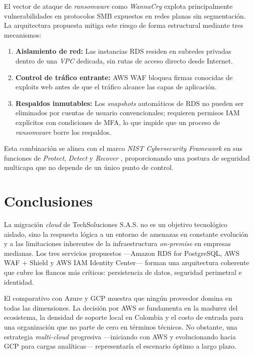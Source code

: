 \documentclass[12pt, a4paper]{article}
\begin{document}
El vector de ataque de \textit{ransomware} como \textit{WannaCry} explota principalmente vulnerabilidades en protocolos SMB expuestos en redes planas sin segmentación. La arquitectura propuesta mitiga este riesgo de forma estructural mediante tres mecanismos:

\begin{enumerate}
  \item \textbf{Aislamiento de red:} Las instancias RDS residen en subredes privadas dentro de una \textit{VPC} dedicada, sin rutas de acceso directo desde Internet.
  \item \textbf{Control de tráfico entrante:} AWS WAF bloquea firmas conocidas de exploits web antes de que el tráfico alcance las capas de aplicación.
  \item \textbf{Respaldos inmutables:} Los \textit{snapshots} automáticos de RDS no pueden ser eliminados por cuentas de usuario convencionales; requieren permisos IAM explícitos con condiciones de MFA, lo que impide que un proceso de \textit{ransomware} borre los respaldos.
\end{enumerate}

Esta combinación se alinea con el marco \textit{NIST Cybersecurity Framework} en sus funciones de \textit{Protect}, \textit{Detect} y \textit{Recover} \autocite{NIST2011}, proporcionando una postura de seguridad multicapa que no depende de un único punto de control.

\section{Conclusiones}

La migración \textit{cloud} de TechSoluciones S.A.S. no es un objetivo tecnológico aislado, sino la respuesta lógica a un entorno de amenazas en constante evolución y a las limitaciones inherentes de la infraestructura \textit{on-premise} en empresas medianas. Los tres servicios propuestos —Amazon RDS for PostgreSQL, AWS WAF + Shield y AWS IAM Identity Center— forman una arquitectura coherente que cubre los flancos más críticos: persistencia de datos, seguridad perimetral e identidad.

El comparativo con Azure y GCP muestra que ningún proveedor domina en todas las dimensiones. La decisión por AWS se fundamenta en la madurez del ecosistema, la densidad de soporte local en Colombia y el costo de entrada para una organización que no parte de cero en términos técnicos. No obstante, una estrategia \textit{multi-cloud} progresiva —iniciando con AWS y evolucionando hacia GCP para cargas analíticas— representaría el escenario óptimo a largo plazo.
\end{document}
